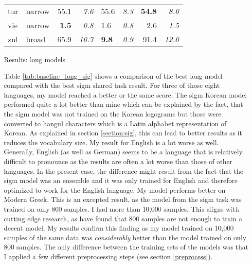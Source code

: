 {\begin{tabularx}{\textwidth}{|l|X||r|r||X|X||r|r|}
tur       & narrow        & 55.1         & \textit{7.6}    & 55.6         & \textit{8.3}          & \textbf{54.8}   & \textit{8.0}    \\
vie       & narrow        & \textbf{1.5} & \textit{0.8}    & 1.6          & \textit{0.8}          & 2.6    & \textit{1.5}    \\
zul       & broad         & 65.9         & \textit{10.7}   & \textbf{9.8}          & \textit{0.9}          & 91.4   & \textit{12.0}   \\ \hline
\end{tabularx}
}{Results: long models}

Table \ref{tab:baseline_long_sig} shows a comparison of the best long model compared with the best \ac{sigm} shared task result. For three of those eight languages, my model reached a better or the same score. The \ac{sigm} Korean model performed quite a lot better than mine which can be explained by the fact, that the \ac{sigm} model was not trained on the Korean logograms but those were converted to hangul characters which is a Latin alphabet representation of Korean. As explained in section \ref{section:sig}, this can lead to better results as it reduces the vocabulary size. My result for English is a lot worse as well. Generally, English (as well as German) seems to be a language that is relatively difficult to pronounce as the results are often a lot worse than those of other languages. In the present case, the difference might result from the fact that the \ac{sigm} model was an ensemble and it was only trained for English and therefore optimized to work for the English language. My model performs better on Modern Greek. This is an excepted result, as the model from the \ac{sigm} task was trained on only 800 samples. I had more than 10,000 samples. This aligns with cutting edge research, as \citet{Ashby-Bartley.2021} have found that 800 samples are not enough to train a decent model. My results confirm this finding as my model trained on 10,000 samples of the same data was \textit{considerably} better than the model trained on only 800 samples. The only difference between the training sets of the models was that I applied a few different preprocessing steps (see section \ref{preprocess}). 

